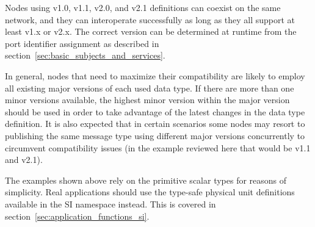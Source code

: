 \begin{remark}[breakable]
    Nodes using v1.0, v1.1, v2.0, and v2.1 definitions can coexist on the same network,
    and they can interoperate successfully as long as they all support at least v1.x or v2.x.
    The correct version can be determined at runtime from the port identifier assignment as described in
    section~\ref{sec:basic_subjects_and_services}.

    In general, nodes that need to maximize their compatibility are likely to employ all existing major versions of
    each used data type.
    If there are more than one minor versions available, the highest minor version within the major version should
    be used in order to take advantage of the latest changes in the data type definition.
    It is also expected that in certain scenarios some nodes may resort to publishing the same message type
    using different major versions concurrently to circumvent compatibility issues
    (in the example reviewed here that would be v1.1 and v2.1).

    The examples shown above rely on the primitive scalar types for reasons of simplicity.
    Real applications should use the type-safe physical unit definitions available in the SI namespace instead.
    This is covered in section~\ref{sec:application_functions_si}.
\end{remark}
